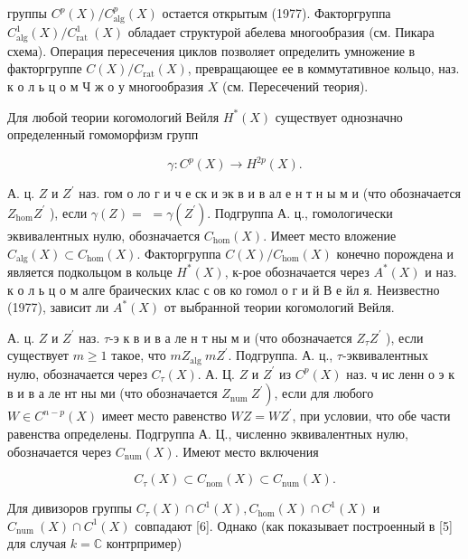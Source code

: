 \documentclass[10pt]{article}
\begin{document}
группы $C^{p}(X) / C_{\mathrm{alg}}^{p}(X)$ остается открытым (1977). Факторгруппа $C_{\mathrm{alg}}^{1}(X) / C_{\text {rat }}^{1}(X)$ обладает структурой абелева многообразия (см. Пикара схема). Операция пересечения циклов позволяет определить умножение в факторгруппе $C(X) / C_{\mathrm{rat}}(X)$, превращающее ее в коммутативное кольцо, наз. к о л ь ц о м Ч ж о у многообразия $X$ (см. Пересечений теория).



Для любой теории когомологий Вейля $H^{*}(X)$ существует однозначно определенный гомоморфизм групп



\[

\gamma: C^{p}(X) \longrightarrow H^{2 p}(X) .

\]



А. ц. $Z$ и $Z^{\prime}$ наз. гом о ло г и ч е ск и эк в и в ал е н т н ы м и (что обозначается $Z_{\mathrm{hom}} Z^{\prime}$ ), если $\gamma(Z)=$ $=\gamma\left(Z^{\prime}\right)$. Подгруппа А. ц., гомологически эквивалентных нулю, обозначается $C_{\mathrm{hom}}(X)$. Имеет место вложение $C_{\mathrm{alg}}(X) \subset C_{\mathrm{hom}}(X)$. Факторгруппа $C(X) / C_{\mathrm{hom}}(X)$ конечно порождена и является подкольцом в кольце $H^{*}(X)$, к-рое обозначается через $A^{*}(X)$ и наз. к о л ь ц о м алге браических клас с ов ко гомол о г и й В е йл я. Неизвестно (1977), зависит ли $A^{*}(X)$ от выбранной теории когомологий Вейля.



А. ц. $Z$ и $Z^{\prime}$ наз. $\tau$-э к в и в а ле н т ны м и (что обозначается $Z_{\tau} Z^{\prime}$ ), если существует $m \geqslant 1$ такое, что $m Z_{\text {alg }} m Z^{\prime}$. Подгруппа. А. ц., $\tau$-эквивалентных нулю, обозначается через $C_{\tau}(X)$. А. Ц. $Z$ и $Z^{\prime}$ из $C^{p}(X)$ наз. ч ис ленн о э к в и в а ле нт ны ми (что обозначается $\left.Z_{\text {num }} Z^{\prime}\right)$, если для любого $W \in C^{n-p}(X)$ имеет место равенство $W Z=W Z^{\prime}$, при условии, что обе части равенства определены. Подгруппа А. Ц., численно эквивалентных нулю, обозначается через $C_{\mathrm{num}}(X)$. Имеют место включения



\[

C_{\tau}(X) \subset C_{\mathrm{nom}}(X) \subset C_{\mathrm{num}}(X) .

\]



Для дивизоров группы $C_{\tau}(X) \cap C^{1}(X), C_{\mathrm{hom}}(X) \cap C^{1}(X)$ и $C_{\text {num }}(X) \cap C^{1}(X)$ совпадают [6]. Однако (как показывает построенный в [5] для случая $k=\mathbb{C}$ контрпример)
\end{document}
